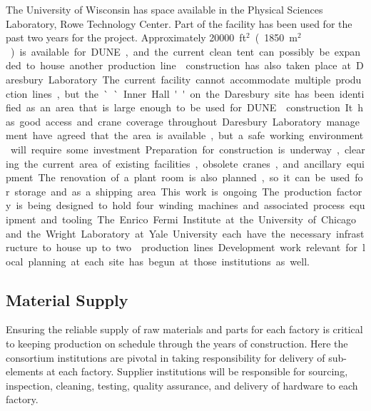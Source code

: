 The University of Wisconsin has space available in the Physical Sciences Laboratory, Rowe Technology Center. Part of the facility has been used for the past two years for the  project. Approximately \SI{20000}{ft$^2$} (\SI{1850}{m$^2$}) is available for DUNE, and the current clean tent can possibly be expanded to house another production line. 

 construction has also taken place at Daresbury Laboratory.  The current facility cannot accommodate multiple production lines, but the ``Inner Hall'' on the Daresbury site has been identified as an area that is large enough to be used for DUNE  construction. It has good access and crane coverage throughout. Daresbury Laboratory management have agreed that the area is available, but a safe working environment will require some investment. Preparation for construction is underway, clearing the current area of existing facilities, obsolete cranes, and ancillary equipment. The renovation of a plant room is also planned, so it can be used for storage and as a shipping area. This work is ongoing. The production factory is being designed to hold four winding machines and associated process equipment and tooling. 

The Enrico Fermi Institute at the University of Chicago and the Wright Laboratory at Yale University each have the necessary infrastructure to house up to two  production lines. Development work relevant for local planning at each site has begun at those institutions as well.


\subsection{Material Supply}  
\label{sec:fdsp-apa-prod-supply}

Ensuring the reliable supply of raw materials and parts for each factory is critical to keeping  production on schedule through the years of construction. Here the consortium institutions are pivotal in taking responsibility for delivery of  sub-elements at each factory. Supplier institutions will be responsible for sourcing, inspection, cleaning, testing, quality assurance, and delivery of hardware to each factory. 

